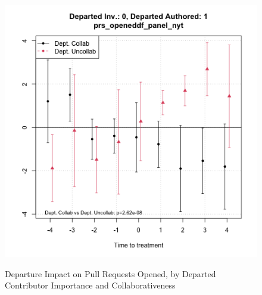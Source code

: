 \begin{figure}[htbp]
\begin{minipage}[b]{0.32\textwidth}
    \label{fig:prs_opened_inv_nonopen}
    \end{minipage}
    \hfill
    \begin{minipage}[b]{0.32\textwidth}
        \centering
        \includegraphics[width=\textwidth]{temp/output/collab_imp/auth1_inv0_cs_norm_prs_opened.png}
        \label{fig:prs_opened_nonvinv_open}

    \end{minipage}
    \caption{Departure Impact on Pull Requests Opened, by Departed Contributor Importance and Collaborativeness}
    \label{fig:prs_opened_inv_collab}
\end{figure}
